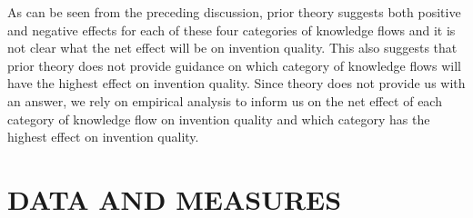 \documentclass[parskip=full,11pt,letterpaper]{article}
\begin{document}
As can be seen from the preceding discussion, prior theory suggests both positive and negative effects for each of these four categories of knowledge flows and it is not clear what the net effect will be on invention quality. This also suggests that prior theory does not provide guidance on which category of knowledge flows will have the highest effect on invention quality.  Since theory does not provide us with an answer, we rely on empirical analysis to inform us on the net effect of each category of knowledge flow on invention quality and which category has the highest effect on invention quality. \par

\section*{DATA AND MEASURES}
\end{document}

